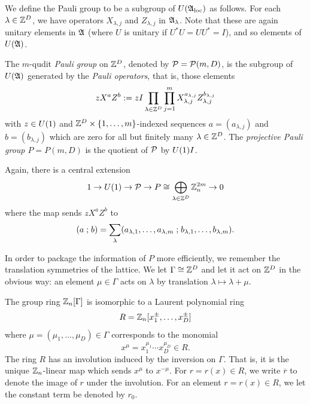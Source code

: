 \documentclass[11pt]{amsart}
\begin{document}
We define the Pauli group to be a subgroup of $U(\mathfrak{A}_{\mathrm{loc}})$ as follows.
For each $\lambda \in \mathbb{Z}^D$, we have operators $X_{\lambda,j}$ and $Z_{\lambda,j}$ in $ \mathfrak{A}_\lambda$. Note that these are again unitary elements in $\mathfrak{A}$ (where $U$ is unitary if $U^*U=UU^*=I$), and so elements of $U(\mathfrak{A})$.
\begin{defn}
The $m$-qudit \emph{Pauli group} on $\mathbb{Z}^D$, denoted by $\mathcal{P} = \mathcal{P}(m,D)$, is the subgroup of $U(\mathfrak{A})$ generated by  the \emph{Pauli operators}, that is, those elements
\[ zX^aZ^b:= z I  \prod_{\lambda \in \mathbb{Z}^D} \prod_{j =1}^m X_{\lambda,j}^{a_{\lambda,j}} Z_{\lambda,j}^{b_{\lambda,j}}  \]
with $z\in U(1) $ and $\mathbb{Z}^D \times \{1,\ldots, m\}$-indexed sequences $a = (a_{\lambda,j})$ and $b=(b_{\lambda,j})$ which are zero for all but finitely many $\lambda \in \mathbb{Z}^D$. The \emph{projective Pauli group $P = P(m,D)$} is the quotient of $\mathcal{P}$ by $U(1)I$.
\end{defn}

Again, there is a central extension
\[1 \to U(1) \to \mathcal{P} \to P\cong \bigoplus_{\lambda \in \mathbb{Z}^D} \mathbb{Z}_n^{2m}   \to 0
\]
where the map sends $zX^{a}Z^{b} $ to
\[  (a  \mathrel{;} b ) =\sum_\lambda (a_{\lambda,1}, \ldots, a_{\lambda,m} \mathrel{;}  b_{\lambda,1}, \ldots, b_{\lambda,m} ). \]

In order to package the information of $P$ more efficiently, we remember the translation symmetries of the lattice. We let $\Gamma \cong \mathbb{Z}^D$ and let it act on $\mathbb{Z}^D$ in the obvious way: an element $\mu \in \Gamma$ acts on $\lambda$ by translation $\lambda \mapsto \lambda+\mu$.

The group ring $\mathbb{Z}_n[\Gamma]$ is isomorphic to a Laurent polynomial ring
\[R = \mathbb{Z}_n[x_1^\pm,\ldots, x_D^\pm]\]
where $\mu= (\mu_1,\ldots, \mu_D) \in \Gamma$ corresponds to the monomial
\[x^\mu = x_1^{\mu_1} \cdots x_D^{\mu_D} \in R.\]
The ring $R$ has an involution induced by the inversion on $\Gamma$. That is, it is the unique $\mathbb{Z}_n$-linear map which sends $x^{\mu}$ to $x^{-\mu}$. For $r =r(x) \in R$, we write $\overline{r}$ to denote the image of $r$ under the involution. For an element $r=r(x) \in R$, we let the constant term be denoted by $r_0$.
\end{document}
